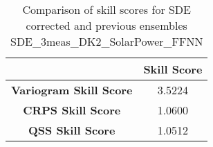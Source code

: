 
        \begin{table}[h!]
            \centering
            \begin{tabular}{|c|c|}
                \hline
                & \textbf{Skill Score}  \\
                \hline
                \textbf{Variogram Skill Score} & 3.5224  \\
                \hline
                \textbf{CRPS Skill Score} & 1.0600  \\
                \hline
                \textbf{QSS Skill Score} & 1.0512 \\
                \hline
            \end{tabular}
            \caption{Comparison of skill scores for SDE corrected and previous ensembles SDE_3meas_DK2_SolarPower_FFNN}
            \label{table:skill_scores_comparison}
        \end{table}
        